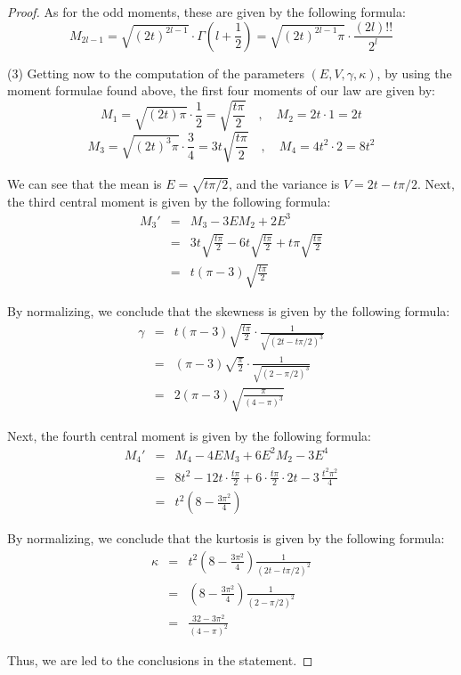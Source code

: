 \documentclass[12pt]{amsbook}
\begin{document}
\begin{proof}
As for the odd moments, these are given by the following formula:
$$M_{2l-1}=\sqrt{(2t)^{2l-1}}\cdot\Gamma\left(l+\frac{1}{2}\right)
=\sqrt{(2t)^{2l-1}\pi}\cdot\frac{(2l)!!}{2^l}$$

(3) Getting now to the computation of the parameters $(E,V,\gamma,\kappa)$, by using the moment formulae found above, the first four moments of our law are given by:
$$M_1=\sqrt{(2t)\pi}\cdot\frac{1}{2}=\sqrt{\frac{t\pi}{2}}\quad,\quad M_2=2t\cdot1=2t$$
$$M_3=\sqrt{(2t)^3\pi}\cdot\frac{3}{4}=3t\sqrt{\frac{t\pi}{2}}\quad,\quad M_4=4t^2\cdot2=8t^2$$

We can see that the mean is $E=\sqrt{t\pi/2}$, and the variance is $V=2t-t\pi/2$. Next, the third central moment is given by the following formula:
\begin{eqnarray*}
M_3'
&=&M_3-3EM_2+2E^3\\
&=&3t\sqrt{\frac{t\pi}{2}}-6t\sqrt{\frac{t\pi}{2}}+t\pi\sqrt{\frac{t\pi}{2}}\\
&=&t(\pi-3)\sqrt{\frac{t\pi}{2}}
\end{eqnarray*} 

By normalizing, we conclude that the skewness is given by the following formula:
\begin{eqnarray*}
\gamma
&=&t(\pi-3)\sqrt{\frac{t\pi}{2}}\cdot\frac{1}{\sqrt{(2t-t\pi/2)^3}}\\
&=&(\pi-3)\sqrt{\frac{\pi}{2}}\cdot\frac{1}{\sqrt{(2-\pi/2)^3}}\\
&=&2(\pi-3)\sqrt{\frac{\pi}{(4-\pi)^3}}
\end{eqnarray*}

Next, the fourth central moment is given by the following formula:
\begin{eqnarray*}
M_4'
&=&M_4-4EM_3+6E^2M_2-3E^4\\
&=&8t^2-12t\cdot\frac{t\pi}{2}+6\cdot\frac{t\pi}{2}\cdot 2t-3\,\frac{t^2\pi^2}{4}\\
&=&t^2\left(8-\frac{3\pi^2}{4}\right)
\end{eqnarray*} 

By normalizing, we conclude that the kurtosis is given by the following formula:
\begin{eqnarray*}
\kappa
&=&t^2\left(8-\frac{3\pi^2}{4}\right)\frac{1}{(2t-t\pi/2)^2}\\
&=&\left(8-\frac{3\pi^2}{4}\right)\frac{1}{(2-\pi/2)^2}\\
&=&\frac{32-3\pi^2}{(4-\pi)^2}
\end{eqnarray*}

Thus, we are led to the conclusions in the statement.
\end{proof}
\end{document}
